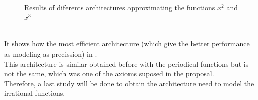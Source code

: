 \documentclass[a4paper, 11pt]{article}
\begin{document}
\begin{figure}[h!]
    \\\vspace{1em}
     \hspace{0.5em}
     \hspace{0.5em}
    \caption{Results of diferents architectures approximating the functions $x^2$ and $x^3$}
    \label{poli100}
\end{figure}\\
It shows how the most efficient architecture (which give the better performance as modeling as precission) in $ $.\\
This architecture is similar obtained before with the periodical functions but is not the same, which was one of the axioms suposed in the proposal.\\
Therefore, a last study will be done to obtain the architecture need to model the irrational functions.
\newpage
\end{document}
